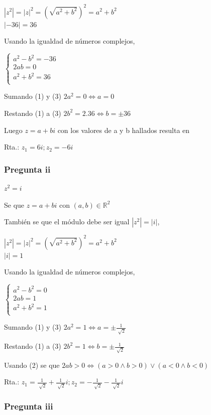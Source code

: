 $ |z^2| = |z|^2 = (\sqrt{a^2+b^2})^2 = a^2+b^2 $ \\
$ |-36| = 36 $

Usando la igualdad de números complejos,

$ \begin{cases}
    a^2-b^2 = -36 \\
    2ab = 0 \\
    a^2+b^2 = 36 \\
\end{cases} $

Sumando (1) y (3) $ 2a^2 = 0 \iff a = 0 $

Restando (1) a (3) $ 2b^2 = 2.36 \iff b = \pm 36 $

Luego $ z = a+bi $ con los valores de a y b hallados resulta en

Rta.: $ z_1 = 6i; z_2 = -6i $

\subsubsection{Pregunta ii}

$ z^2 = i $

Se que $ z = a+bi $ con $ (a,b) \in \mathbb{R}^2 $

También se que el módulo debe ser igual $ |z^2| = |i| $,

$ |z^2| = |z|^2 = (\sqrt{a^2+b^2})^2 = a^2+b^2 $ \\
$ |i| = 1 $

Usando la igualdad de números complejos,

$ \begin{cases}
    a^2-b^2 = 0 \\
    2ab = 1 \\
    a^2+b^2 = 1 \\
\end{cases} $

Sumando (1) y (3) $ 2a^2 = 1 \iff a = \pm \frac{1}{\sqrt[]{2}} $

Restando (1) a (3) $ 2b^2 = 1 \iff b = \pm \frac{1}{\sqrt[]{2}} $

Usando (2) se que $ 2ab > 0 \iff (a > 0 \wedge b > 0) \vee (a < 0 \wedge b < 0) $

Rta.: $ z_1 = \frac{1}{\sqrt[]{2}} + \frac{1}{\sqrt[]{2}}i; z_2 = -\frac{1}{\sqrt[]{2}} - \frac{1}{\sqrt[]{2}}i $

\subsubsection{Pregunta iii}

